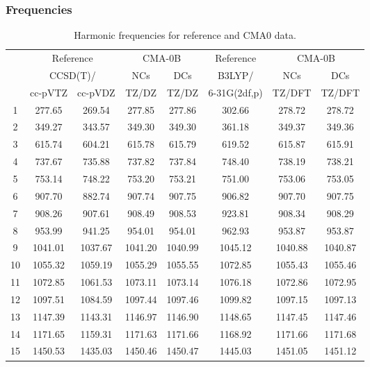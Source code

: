 \documentclass[10pt,oneside]{article}
\begin{document}
\clearpage

\subsubsection*{Frequencies}
\begin{table}[h!]
\centering
\caption{Harmonic frequencies for reference and CMA0 data.}
\begin{tabular}{cccccccc}
\toprule
{} & \multicolumn{2}{c}{Reference} & \multicolumn{2}{c}{CMA-0B} &    Reference & \multicolumn{2}{c}{CMA-0B} \\
{} & \multicolumn{2}{c}{CCSD(T)/} &     NCs &     DCs &       B3LYP/ &     NCs &     DCs \\
{} &   cc-pVTZ & cc-pVDZ &   TZ/DZ &   TZ/DZ & 6-31G(2df,p) &  TZ/DFT &  TZ/DFT \\
\midrule
1  &    277.65 &  269.54 &  277.85 &  277.86 &       302.66 &  278.72 &  278.72 \\
2  &    349.27 &  343.57 &  349.30 &  349.30 &       361.18 &  349.37 &  349.36 \\
3  &    615.74 &  604.21 &  615.78 &  615.79 &       619.52 &  615.87 &  615.91 \\
4  &    737.67 &  735.88 &  737.82 &  737.84 &       748.40 &  738.19 &  738.21 \\
5  &    753.14 &  748.22 &  753.20 &  753.21 &       751.00 &  753.06 &  753.05 \\
6  &    907.70 &  882.74 &  907.74 &  907.75 &       906.82 &  907.70 &  907.75 \\
7  &    908.26 &  907.61 &  908.49 &  908.53 &       923.81 &  908.34 &  908.29 \\
8  &    953.99 &  941.25 &  954.01 &  954.01 &       962.93 &  953.87 &  953.87 \\
9  &   1041.01 & 1037.67 & 1041.20 & 1040.99 &      1045.12 & 1040.88 & 1040.87 \\
10 &   1055.32 & 1059.19 & 1055.29 & 1055.55 &      1072.85 & 1055.43 & 1055.46 \\
11 &   1072.85 & 1061.53 & 1073.11 & 1073.14 &      1076.18 & 1072.86 & 1072.95 \\
12 &   1097.51 & 1084.59 & 1097.44 & 1097.46 &      1099.82 & 1097.15 & 1097.13 \\
13 &   1147.39 & 1143.31 & 1146.97 & 1146.90 &      1148.65 & 1147.45 & 1147.46 \\
14 &   1171.65 & 1159.31 & 1171.63 & 1171.66 &      1168.92 & 1171.66 & 1171.68 \\
15 &   1450.53 & 1435.03 & 1450.46 & 1450.47 &      1445.03 & 1451.05 & 1451.12 \\

\end{tabular}
\end{table}
\end{document}

